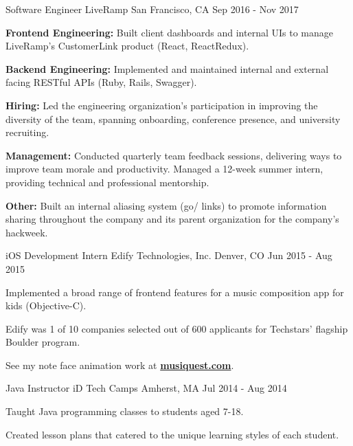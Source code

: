 \begin{cventries}
  \cventry
    {Software Engineer} %
    {LiveRamp} %
    {San Francisco, CA} %
    {Sep 2016 - Nov 2017} %
    {
      \begin{cvitems} %
        \item \textbf{Frontend Engineering:} {Built client dashboards and internal UIs to manage LiveRamp's CustomerLink product (React, ReactRedux).}
        \item \textbf{Backend Engineering:} {Implemented and maintained internal and external facing RESTful APIs (Ruby, Rails, Swagger).}
        \item \textbf{Hiring:} {Led the engineering organization's participation in improving the diversity of the team, spanning onboarding, conference presence, and university recruiting.}
        \item \textbf{Management:} {Conducted quarterly team feedback sessions, delivering ways to improve team morale and productivity. Managed a 12-week summer intern, providing technical and professional mentorship.}
        \item \textbf{Other:} {Built an internal aliasing system (go/ links) to promote information sharing throughout the company and its parent organization for the company's hackweek.}        
      \end{cvitems}
    }

  \cventry
    {iOS Development Intern} %
    {Edify Technologies, Inc.} %
    {Denver, CO} %
    {Jun 2015 - Aug 2015} %
    {
      \begin{cvitems} %
        \item {Implemented a broad range of frontend features for a music composition app for kids (Objective-C).}
        \item {Edify was 1 of 10 companies selected out of 600 applicants for Techstars' flagship Boulder program.}
        \item {See my note face animation work at} \textbf{\href{http://www.musiquest.com}{musiquest.com}}.
      \end{cvitems}
    }

  \cventry
    {Java Instructor} %
    {iD Tech Camps} %
    {Amherst, MA} %
    {Jul 2014 - Aug 2014} %
    {
      \begin{cvitems} %
        \item {Taught Java programming classes to students aged 7-18.}
        \item {Created lesson plans that catered to the unique learning styles of each student.}
      \end{cvitems}
    }

\end{cventries}
